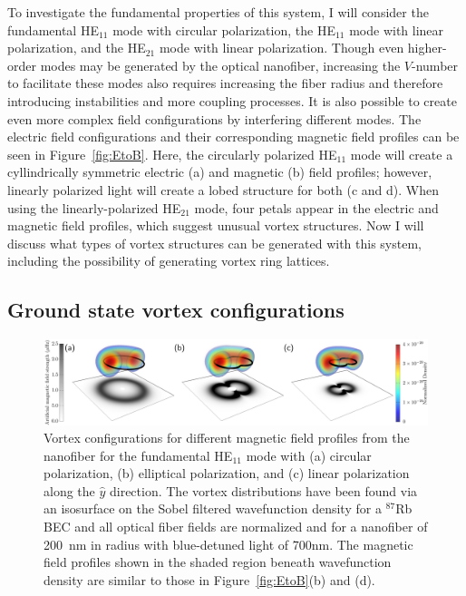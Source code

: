 To investigate the fundamental properties of this system, I will consider the fundamental HE$_{11}$ mode with circular polarization, the HE$_{11}$ mode with linear polarization, and the HE$_{21}$ mode with linear polarization.
Though even higher-order modes may be generated by the optical nanofiber, increasing the $V$-number to facilitate these modes also requires increasing the fiber radius and therefore introducing instabilities and more coupling processes.
It is also possible to create even more complex field configurations by interfering different modes.
The electric field configurations and their corresponding magnetic field profiles can be seen in Figure~\ref{fig:EtoB}.
Here, the circularly polarized HE$_{11}$ mode will create a cyllindrically symmetric electric (a) and magnetic (b) field profiles; however, linearly polarized light will create a lobed structure for both (c and d).
When using the linearly-polarized HE$_{21}$ mode, four petals appear in the electric and magnetic field profiles, which suggest unusual vortex structures.
Now I will discuss what types of vortex structures can be generated with this system, including the possibility of generating vortex ring lattices.

\subsection{Ground state vortex configurations}

\begin{figure}[tb]
\includegraphics[width=\textwidth]{data/3d/vortex_transition.png}
\caption{Vortex configurations for different magnetic field profiles from the nanofiber for the fundamental HE$_{11}$ mode with (a) circular polarization, (b) elliptical polarization, and (c) linear polarization along the $\hat y$ direction.
The vortex distributions have been found via an isosurface on the Sobel filtered wavefunction density for a $^{87}$Rb BEC and all optical fiber fields are normalized and for a nanofiber of 200~nm in radius with blue-detuned light of 700nm.
The magnetic field profiles shown in the shaded region beneath wavefunction density are similar to those in Figure~\ref{fig:EtoB}(b) and (d).}
\label{fig:VortexRings}
\end{figure}

